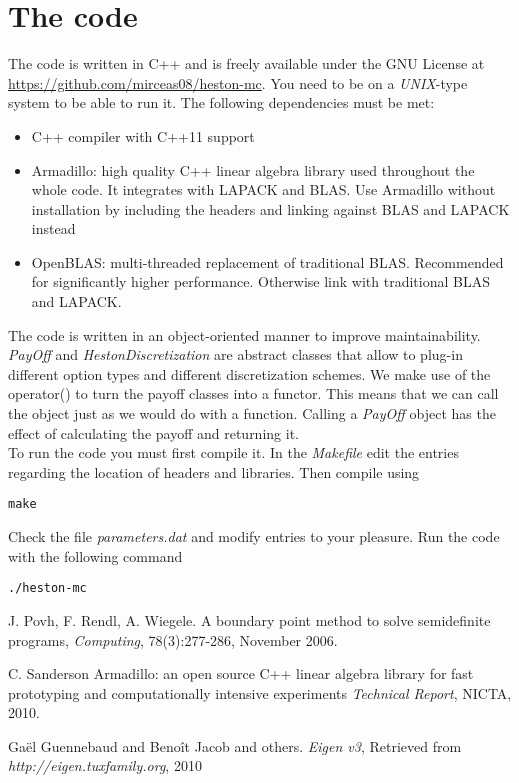 \documentclass[12pt]{article}
\numberwithin{equation}{section}
\begin{document}
\section{The code}
The code is written in C++ and is freely available under the GNU License at \url{https://github.com/mirceas08/heston-mc}. You need to be on a {\it UNIX}-type system to be able to run it. The following dependencies must be met:
\begin{itemize}
  \item C++ compiler with C++11 support
  \item Armadillo: high quality C++ linear algebra library used throughout the whole code. It integrates with LAPACK and BLAS. Use Armadillo without installation by including the headers and linking against BLAS and LAPACK instead
  \item OpenBLAS: multi-threaded replacement of traditional BLAS. Recommended for significantly higher performance. Otherwise link with traditional BLAS and LAPACK.
\end{itemize} 
The code is written in an object-oriented manner to improve maintainability. \textit{PayOff} and \textit{HestonDiscretization} are abstract classes that allow to plug-in different option types and different discretization schemes. We make use of the operator() to turn the payoff classes into a functor. This means that we can call the object just as we would do with a function. Calling a \textit{PayOff} object has the effect of calculating the payoff and returning it.\\
\newline
To run the code you must first compile it. In the \textit{Makefile} edit the entries regarding the location of headers and libraries. Then compile using
\begin{verbatim}
make
\end{verbatim}
Check the file \textit{parameters.dat} and modify entries to your pleasure. Run the code with the following command
\begin{verbatim}
./heston-mc
\end{verbatim}



\newpage

\begin{thebibliography}{9}
J. Povh, F. Rendl, A. Wiegele. 
A boundary point method to solve semidefinite programs,
\textit{Computing}, 78(3):277-286, November 2006.
 
C. Sanderson 
Armadillo: an open source C++ linear algebra library for fast prototyping and computationally intensive experiments
\textit{Technical Report}, NICTA, 2010.
 
Ga\"{e}l Guennebaud and Beno\^{i}t Jacob and others.
\textit{Eigen v3},
Retrieved from \textit{http://eigen.tuxfamily.org}, 2010
\end{thebibliography}
\end{document}
